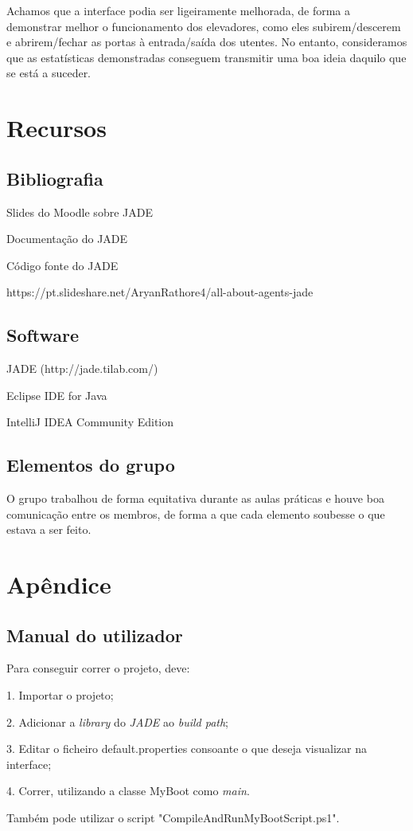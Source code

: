 \documentclass[a4paper]{article}
\begin{document}
Achamos que a interface podia ser ligeiramente melhorada, de forma a demonstrar melhor o funcionamento dos elevadores, como eles subirem/descerem e abrirem/fechar as portas à entrada/saída dos utentes. No entanto, consideramos que as estatísticas demonstradas conseguem transmitir uma boa ideia daquilo que se está a suceder.

\newpage


\section{Recursos}

\subsection{Bibliografia} 

Slides do Moodle sobre JADE

Documentação do JADE

Código fonte do JADE

https://pt.slideshare.net/AryanRathore4/all-about-agents-jade

\subsection{Software} 

JADE (http://jade.tilab.com/)

Eclipse IDE for Java

IntelliJ IDEA Community Edition

\subsection{Elementos do grupo}

O grupo trabalhou de forma equitativa durante as aulas práticas e houve boa comunicação entre os membros, de forma a que cada elemento soubesse o que estava a ser feito.

\section{Apêndice}

\subsection{Manual do utilizador} 

Para conseguir correr o projeto, deve:

1. Importar o projeto;

2. Adicionar a \textit{library} do \textit{JADE} ao \textit{build path};

3. Editar o ficheiro default.properties consoante o que deseja visualizar na interface;

4. Correr, utilizando a classe MyBoot como \textit{main}.

Também pode utilizar o script "CompileAndRunMyBootScript.ps1".

\newpage

\end{document}
